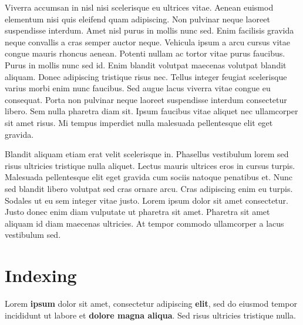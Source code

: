 \documentclass[a4paper, 12pt]{report}
\begin{document}
Viverra accumsan in nisl nisi scelerisque eu ultrices vitae. Aenean euismod elementum nisi quis eleifend quam adipiscing. Non pulvinar neque laoreet suspendisse interdum. Amet nisl purus in mollis nunc sed. Enim facilisis gravida neque convallis a cras semper auctor neque. Vehicula ipsum a arcu cursus vitae congue mauris rhoncus aenean. Potenti nullam ac tortor vitae purus faucibus. Purus in mollis nunc sed id. Enim blandit volutpat maecenas volutpat blandit aliquam. Donec adipiscing tristique risus nec. Tellus integer feugiat scelerisque varius morbi enim nunc faucibus. Sed augue lacus viverra vitae congue eu consequat. Porta non pulvinar neque laoreet suspendisse interdum consectetur libero. Sem nulla pharetra diam sit. Ipsum faucibus vitae aliquet nec ullamcorper sit amet risus. Mi tempus imperdiet nulla malesuada pellentesque elit eget gravida.\citep{ibm}

Blandit aliquam etiam erat velit scelerisque in. Phasellus vestibulum lorem sed risus ultricies tristique nulla aliquet. Lectus mauris ultrices eros in cursus turpis. Malesuada pellentesque elit eget gravida cum sociis natoque penatibus et. Nunc sed blandit libero volutpat sed cras ornare arcu. Cras adipiscing enim eu turpis. Sodales ut eu sem integer vitae justo. Lorem ipsum dolor sit amet consectetur. Justo donec enim diam vulputate ut pharetra sit amet. Pharetra sit amet aliquam id diam maecenas ultricies. At tempor commodo ullamcorper a lacus vestibulum sed. \citep{clear2018atomic}



\chapter{Indexing}
Lorem \textbf{ipsum} dolor sit amet, consectetur adipiscing \textbf{elit}, sed do eiusmod tempor incididunt ut labore et \textbf{dolore magna aliqua}. Sed risus ultricies tristique nulla.






\printindex
\end{document}
